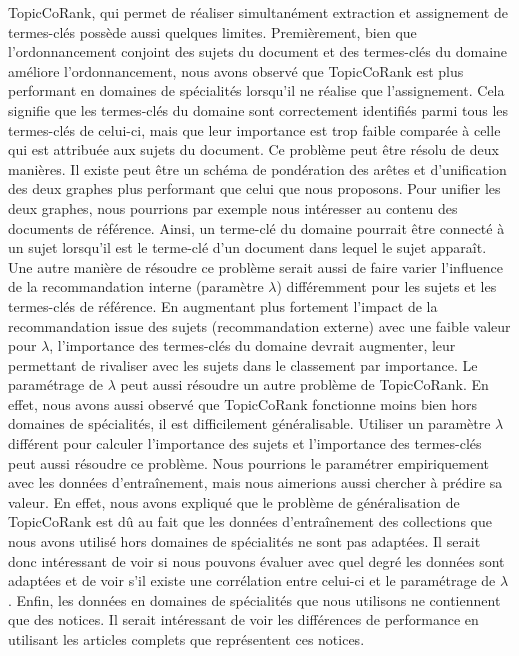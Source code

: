     TopicCoRank, qui permet de réaliser simultanément extraction et assignement
    de termes-clés possède aussi quelques limites. Premièrement, bien que
    l'ordonnancement conjoint des sujets du document et des termes-clés du
    domaine améliore l'ordonnancement, nous avons observé que TopicCoRank est
    plus performant en domaines de spécialités lorsqu'il ne réalise que
    l'assignement. Cela signifie que les termes-clés du domaine sont
    correctement identifiés parmi tous les termes-clés de celui-ci, mais que
    leur importance est trop faible comparée à celle qui est attribuée aux
    sujets du document. Ce problème peut être résolu de deux manières. Il existe
    peut être un schéma de pondération des arêtes et d'unification des deux
    graphes plus performant que celui que nous proposons. Pour unifier les deux
    graphes, nous pourrions par exemple nous intéresser au contenu des documents
    de référence. Ainsi, un terme-clé du domaine pourrait être connecté à un
    sujet lorsqu'il est le terme-clé d'un document dans lequel le sujet
    apparaît. Une autre manière de résoudre ce problème serait aussi de faire
    varier l'influence de la recommandation interne (paramètre $\lambda$)
    différemment pour les sujets et les termes-clés de référence. En augmentant
    plus fortement l'impact de la recommandation issue des sujets
    (recommandation externe) avec une faible valeur pour $\lambda$,
    l'importance des termes-clés du domaine devrait augmenter, leur permettant
    de rivaliser avec les sujets dans le classement par importance. Le paramétrage de
    $\lambda$ peut aussi résoudre un autre problème de TopicCoRank. En effet,
    nous avons aussi observé que TopicCoRank fonctionne moins bien hors domaines
    de spécialités, il est difficilement généralisable. Utiliser un paramètre
    $\lambda$ différent pour calculer l'importance des sujets et l'importance
    des termes-clés peut aussi résoudre ce problème. Nous pourrions le
    paramétrer empiriquement avec les données d'entraînement, mais nous
    aimerions aussi chercher à prédire sa valeur. En effet, nous avons expliqué
    que le problème de généralisation de TopicCoRank est dû au fait que les
    données d'entraînement des collections que nous avons utilisé hors domaines
    de spécialités ne sont pas adaptées. Il serait donc intéressant de voir si
    nous pouvons évaluer avec quel degré les données sont adaptées et de voir
    s'il existe une corrélation entre celui-ci et le paramétrage de $\lambda$.
    Enfin, les données en domaines de spécialités que nous utilisons ne
    contiennent que des notices. Il serait intéressant de voir les différences
    de performance en utilisant les articles complets que représentent ces notices.

